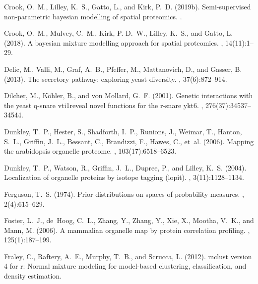 \documentclass[12pt,english]{article}
\begin{document}
\begin{thebibliography}{}
Crook, O.~M., Lilley, K.~S., Gatto, L., and Kirk, P.~D. (2019b).
\newblock Semi-supervised non-parametric bayesian modelling of spatial
  proteomics.
.

Crook, O.~M., Mulvey, C.~M., Kirk, P. D.~W., Lilley, K.~S., and Gatto, L.
  (2018).
\newblock A bayesian mixture modelling approach for spatial proteomics.
, 14(11):1--29.

Delic, M., Valli, M., Graf, A.~B., Pfeffer, M., Mattanovich, D., and Gasser, B.
  (2013).
\newblock The secretory pathway: exploring yeast diversity.
, 37(6):872--914.

Dilcher, M., K{\"o}hler, B., and von Mollard, G.~F. (2001).
\newblock Genetic interactions with the yeast q-snare vti1reveal novel
  functions for the r-snare ykt6.
, 276(37):34537--34544.

Dunkley, T.~P., Hester, S., Shadforth, I.~P., Runions, J., Weimar, T., Hanton,
  S.~L., Griffin, J.~L., Bessant, C., Brandizzi, F., Hawes, C., et~al. (2006).
\newblock Mapping the arabidopsis organelle proteome.
,
  103(17):6518--6523.

Dunkley, T.~P., Watson, R., Griffin, J.~L., Dupree, P., and Lilley, K.~S.
  (2004).
\newblock Localization of organelle proteins by isotope tagging (lopit).
, 3(11):1128--1134.

Ferguson, T.~S. (1974).
\newblock Prior distributions on spaces of probability measures.
, 2(4):615--629.

Foster, L.~J., de~Hoog, C.~L., Zhang, Y., Zhang, Y., Xie, X., Mootha, V.~K.,
  and Mann, M. (2006).
\newblock A mammalian organelle map by protein correlation profiling.
, 125(1):187--199.

Fraley, C., Raftery, A.~E., Murphy, T.~B., and Scrucca, L. (2012).
\newblock mclust version 4 for r: Normal mixture modeling for model-based
  clustering, classification, and density estimation.


\end{thebibliography}
\end{document}
